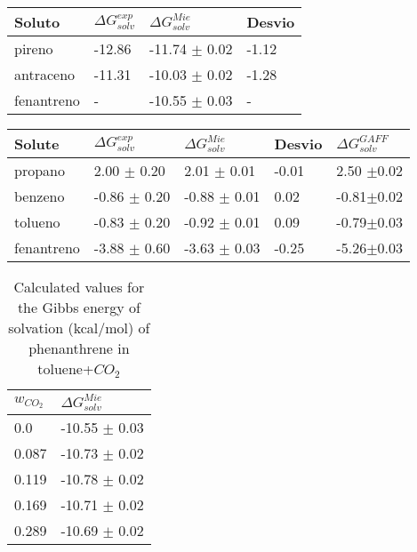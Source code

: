 \begin{table*}[h]
\center
  \label{tbl:solv1tes}
  \begin{tabular}{llll}
    \hline
     Soluto & $\Delta G_{solv}^{exp}$ & $\Delta G_{solv}^{Mie}$ & Desvio \\
    \hline
    pireno       & -12.86 & -11.74 $\pm$ 0.02 & -1.12\\
    antraceno   & -11.31 & -10.03 $\pm$ 0.02 & -1.28\\
    fenantreno   & - & -10.55 $\pm$ 0.03 & -\\
    \hline
  \end{tabular}

\end{table*}

\begin{table*}[h]
\center
  \label{tbl:solv2}
  \begin{tabular}{lllll}
    \hline
     Solute      & $\Delta G_{solv}^{exp}$ & $\Delta G_{solv}^{Mie}$ & Desvio &$\Delta G_{solv}^{GAFF}$ \\
    \hline
    propano      &  2.00 $\pm$ 0.20 & 2.01 $\pm$ 0.01& -0.01 &2.50 $\pm$0.02 \\
    benzeno      & -0.86 $\pm$ 0.20 & -0.88 $\pm$ 0.01    &  0.02    &-0.81$\pm$0.02 \\  
    tolueno      & -0.83 $\pm$ 0.20 & -0.92 $\pm$ 0.01   &  0.09    &-0.79$\pm$0.03\\
    fenantreno & -3.88 $\pm$ 0.60 & -3.63 $\pm$ 0.03& -0.25 &-5.26$\pm$0.03 \\
    \hline
  \end{tabular}
\end{table*}

\begin{table}[h]
\center
  \caption{Calculated values for the Gibbs energy of solvation (kcal/mol) of phenanthrene in toluene+$CO_{2}$}
  \label{tbl:solv3}
  \begin{tabular}{ll}
    \hline
      $w_{CO_{2}}$ & $\Delta G_{solv}^{Mie}$ \\
    \hline
    0.0    & -10.55 $\pm$ 0.03   \\
    0.087  & -10.73 $\pm$ 0.02   \\
    0.119  & -10.78 $\pm$ 0.02   \\
    0.169  & -10.71 $\pm$ 0.02   \\
    0.289  & -10.69 $\pm$ 0.02   \\
    \hline
  \end{tabular}

\end{table}

